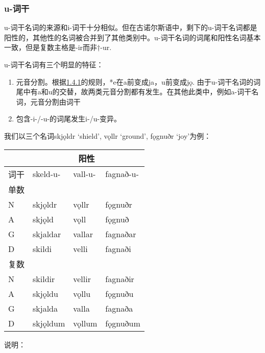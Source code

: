 \subsubsection{u-词干}\label{u-ux8bcdux5e72}

u-词干名词的来源和i-词干十分相似。但在古诺尔斯语中，剩下的u-词干名词都是阳性的，其他性的名词被合并到了其他类别中。u-词干名词的词尾和阳性名词基本一致，但是复数主格是-ir而非†-ur.

u-词干名词有三个明显的特征：

\begin{enumerate}
\def\labelenumi{\arabic{enumi})}
\item
  元音分割。根据\hyperref[ux5143ux97f3ux7684ux97f3ux53d8]{1.4.1}的规则，*e在a前变成ja，u前变成jǫ.
  由于u-词干名词的词尾中有a和u的交替，故两类元音分割都有发生。在其他此类中，例如a-词干名词，元音分割由词干
\item
  包含-i-/-u-的词尾发生i-/u-变异。
\end{enumerate}

我们以三个名词skjǫldr `shield', vǫllr `ground', fǫgnuðr `joy'为例：

\begin{longtable}{llll}
\toprule
 &\multicolumn{3}{c}{阳性} \\
\midrule
\endhead
\bottomrule
\endfoot
词干 & skeld-u- & vall-u- & fagnað-u- \\
单数 & & & \\
N & skjǫldr & vǫllr & fǫgnuðr \\
A & skjǫld & vǫll & fǫgnuð \\
G & skjaldar & vallar & fagnaðar \\
D & skildi & velli & fagnaði \\
复数 & & & \\
N & skildir & vellir & fagnaðir \\
A & skjǫldu & vǫllu & fǫgnuðu \\
G & skjalda & valla & fagnaða \\
D & skjǫldum & vǫllum & fǫgnuðum \\
\end{longtable}

说明：

